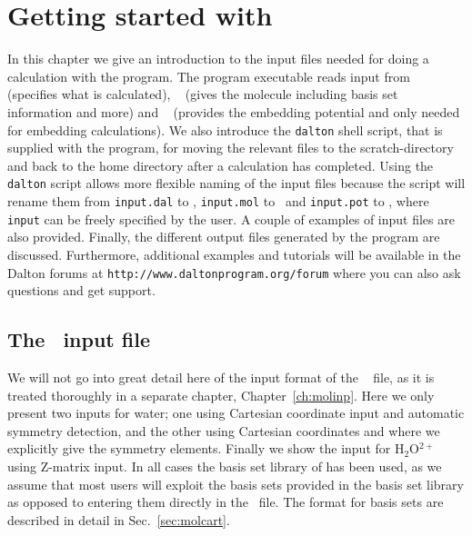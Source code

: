 \chapter{Getting started with {\dalton}}\label{ch:starting}

In this chapter we give an introduction to the input files needed
for doing a calculation with the {\dalton} program. The program executable reads input
from \dalinp\  (specifies what is calculated), \molinp\  (gives
the molecule including basis set information and more) and \potinp\  (provides the embedding potential and only needed for
embedding calculations). We also introduce the \verb|dalton| shell script,
that is supplied with the program, for moving the relevant files to the
scratch-directory and back to the home directory after a calculation has completed.
Using the \verb|dalton| script allows more flexible naming of the input files because the script will rename them from \verb|input.dal| to \dalinp, \verb|input.mol| to \molinp\ and \verb|input.pot| to \potinp, where \verb|input| can be freely specified by the user.
A couple of examples of input files are also provided. Finally, the different output
files generated by the program are discussed. Furthermore, additional examples and 
tutorials will be available in the
Dalton forums at \verb|http://www.daltonprogram.org/forum| where you can also ask 
questions and get support.

\section{The \molinp\ input file}

We will not go into great detail here of the input format of the \molinp\  file, as it is treated thoroughly in a separate chapter,
Chapter~\ref{ch:molinp}.
Here we only present two inputs for water; one
using Cartesian coordinate input and
automatic symmetry detection, and
the other using Cartesian coordinates and where we explicitly give the
symmetry elements. Finally we show the input for H$_{2}$O$^{2+}$
using Z-matrix input. In
all cases the basis set library of {\dalton} has been used, as we
assume that most users will exploit the basis sets provided in the basis
set library as opposed to entering them directly in the \molinp\ file. The format for basis sets are described in detail in Sec.~\ref{sec:molcart}.

